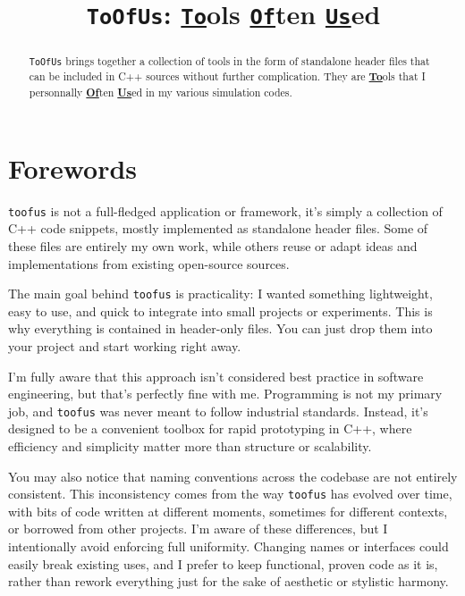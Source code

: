 \documentclass[a4paper,onecolumn,11pt]{doofus}
\title{\texttt{ToOfUs}: \underline{\texttt{To}}ols \underline{\texttt{Of}}ten \underline{\texttt{Us}}ed}
\begin{document}
\makedoofustitle

\begin{abstract}
\texttt{ToOfUs} brings together a collection of tools in the form of standalone header files that can be included in C++ sources without further complication.
They are \underline{\textbf{To}}ols that I personnally \underline{\textbf{Of}}ten \underline{\textbf{Us}}ed in my various simulation codes.
\end{abstract}

\setcounter{tocdepth}{2}
\tableofcontents

\newpage
\section{Forewords}


\texttt{toofus} is not a full-fledged application or framework, it's simply a collection of C++ code snippets, mostly implemented as standalone header files. Some of these files are entirely my own work, while others reuse or adapt ideas and implementations from existing open-source sources.

The main goal behind \texttt{toofus} is practicality: I wanted something lightweight, easy to use, and quick to integrate into small projects or experiments. This is why everything is contained in header-only files. You can just drop them into your project and start working right away.

I'm fully aware that this approach isn't considered best practice in software engineering, but that's perfectly fine with me. Programming is not my primary job, and \texttt{toofus} was never meant to follow industrial standards. Instead, it's designed to be a convenient toolbox for rapid prototyping in C++, where efficiency and simplicity matter more than structure or scalability.

You may also notice that naming conventions across the codebase are not entirely consistent. This inconsistency comes from the way \texttt{toofus} has evolved over time, with bits of code written at different moments, sometimes for different contexts, or borrowed from other projects. I'm aware of these differences, but I intentionally avoid enforcing full uniformity. Changing names or interfaces could easily break existing uses, and I prefer to keep functional, proven code as it is, rather than rework everything just for the sake of aesthetic or stylistic harmony.
\end{document}
